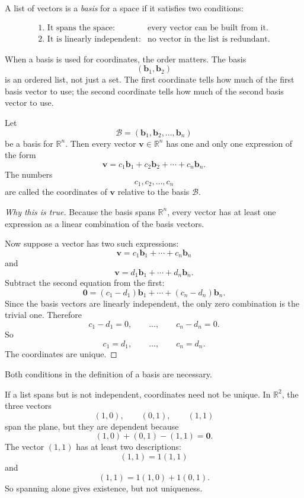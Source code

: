 \begin{definition}[Basis]
A list of vectors is a \emph{basis} for a space if it satisfies two conditions:

\[
\begin{array}{ll}
\text{1. It spans the space:} & \text{every vector can be built from it.}\\[2mm]
\text{2. It is linearly independent:} & \text{no vector in the list is redundant.}
\end{array}
\]
\end{definition}

When a basis is used for coordinates, the order matters.  The basis
\[
    (\mathbf b_1,\mathbf b_2)
\]
is an ordered list, not just a set.  The first coordinate tells how much of the first
basis vector to use; the second coordinate tells how much of the second basis vector
to use.

\begin{theorem}
Let
\[
    \mathcal B=(\mathbf b_1,\mathbf b_2,\ldots,\mathbf b_n)
\]
be a basis for \(\mathbb R^n\).  Then every vector \(\mathbf v\in\mathbb R^n\) has
one and only one expression of the form
\[
    \mathbf v
    =
    c_1\mathbf b_1+c_2\mathbf b_2+\cdots+c_n\mathbf b_n.
\]
The numbers
\[
    c_1,c_2,\ldots,c_n
\]
are called the coordinates of \(\mathbf v\) relative to the basis \(\mathcal B\).
\end{theorem}

\begin{proof}[Why this is true]
Because the basis spans \(\mathbb R^n\), every vector has at least one expression as a
linear combination of the basis vectors.

Now suppose a vector has two such expressions:
\[
    \mathbf v
    =
    c_1\mathbf b_1+\cdots+c_n\mathbf b_n
\]
and
\[
    \mathbf v
    =
    d_1\mathbf b_1+\cdots+d_n\mathbf b_n.
\]
Subtract the second equation from the first:
\[
    \mathbf 0
    =
    (c_1-d_1)\mathbf b_1+\cdots+(c_n-d_n)\mathbf b_n.
\]
Since the basis vectors are linearly independent, the only zero combination is the
trivial one.  Therefore
\[
    c_1-d_1=0,\qquad \ldots,\qquad c_n-d_n=0.
\]
So
\[
    c_1=d_1,\qquad \ldots,\qquad c_n=d_n.
\]
The coordinates are unique.
\end{proof}

Both conditions in the definition of a basis are necessary.

If a list spans but is not independent, coordinates need not be unique.  In
\(\mathbb R^2\), the three vectors
\[
    (1,0),\qquad (0,1),\qquad (1,1)
\]
span the plane, but they are dependent because
\[
    (1,0)+(0,1)-(1,1)=\mathbf 0.
\]
The vector \((1,1)\) has at least two descriptions:
\[
    (1,1)=1(1,1)
\]
and
\[
    (1,1)=1(1,0)+1(0,1).
\]
So spanning alone gives existence, but not uniqueness.

